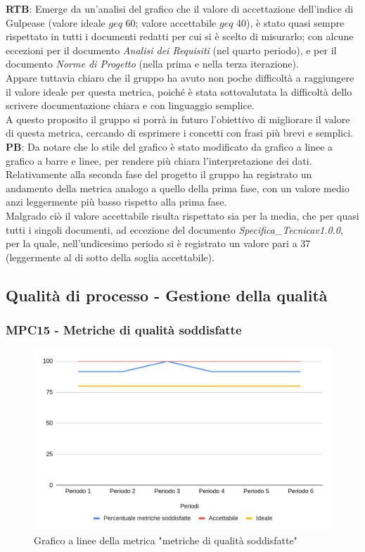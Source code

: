 \documentclass[10pt]{article}
\begin{document}
\begin{justify}
\textbf{RTB}: Emerge da un'analisi del grafico che il valore di accettazione dell'indice di Gulpease (valore ideale $geq$ 60; valore accettabile $geq$ 40), è stato quasi sempre rispettato in tutti i documenti
redatti per cui si è scelto di misurarlo; con alcune eccezioni per il documento \textit{Analisi dei Requisiti} (nel quarto periodo), e per il documento \textit{Norme di Progetto} (nella prima e nella terza iterazione).\\
Appare tuttavia chiaro che il gruppo ha avuto non poche difficoltà a raggiungere il valore ideale per questa metrica, poiché è stata sottovalutata la difficoltà dello 
scrivere documentazione chiara e con linguaggio semplice.\\
A questo proposito il gruppo si porrà in futuro l'obiettivo di migliorare il valore di questa metrica, cercando di esprimere i concetti con frasi più brevi e semplici.\\

\noindent
\textbf{PB}: Da notare che lo stile del grafico è stato modificato da grafico a linee a grafico a barre e linee, per rendere più chiara l'interpretazione dei dati.\\
Relativamente alla seconda fase del progetto il gruppo ha registrato un andamento della metrica analogo a quello della prima fase, con un valore medio anzi leggermente 
più basso rispetto alla prima fase.\\
Malgrado ciò il valore accettabile risulta rispettato sia per la media, che per quasi tutti i singoli documenti, ad eccezione del documento \textit{Specifica\_Tecnicav1.0.0}, 
per la quale, nell'undicesimo periodo si è registrato un valore pari a 37 (leggermente al di sotto della soglia accettabile).\\


\subsection{Qualità di processo - Gestione della qualità}
\subsubsection{MPC15 - Metriche di qualità soddisfatte}%

\begin{figure}[H]
  \centering
  \includegraphics[width=0.9\linewidth]{metricheRispettate.png}
  \caption{Grafico a linee della metrica "metriche di qualità soddisfatte"}
  \label{fig:metricheRispettate_chart}
\end{figure}


\end{justify}
\end{document}
